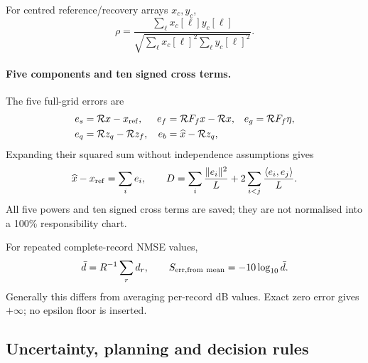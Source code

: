 For centred reference/recovery arrays $x_c,y_c$,
\begin{equation}
 \rho=\frac{\sum_\ell x_c[\ell]y_c[\ell]}
 {\sqrt{\sum_\ell x_c[\ell]^2\sum_\ell y_c[\ell]^2}}.
 \label{eq:r41-correlation}
\end{equation}

\paragraph{Five components and ten signed cross terms.}
The five full-grid errors are
\begin{align}
 e_s&=\mathcal R x-x_{\rm ref},&
 e_f&=\mathcal R F_fx-\mathcal R x,&
 e_g&=\mathcal R F_f\eta,\nonumber\\
 e_q&=\mathcal R z_q-\mathcal R z_f,&
 e_b&=\widehat x-\mathcal R z_q,
 \label{eq:r42-components}
\end{align}
Expanding their squared sum without independence assumptions gives
\begin{equation}
 \widehat x-x_{\rm ref}=\sum_i e_i,\qquad
 D=\sum_i\frac{\|e_i\|^2}{L}
   +2\sum_{i<j}\frac{\langle e_i,e_j\rangle}{L}.
 \label{eq:r42-component-power}
\end{equation}
All five powers and ten signed cross terms are saved; they are not
normalised into a 100\% responsibility chart.

For repeated complete-record NMSE values,
\begin{equation}
 \bar d=R^{-1}\sum_rd_r,\qquad
 S_{\rm err,from\ mean}=-10\log_{10}\bar d.
 \label{eq:r41-average}
\end{equation}
Generally this differs from averaging per-record dB values. Exact zero
error gives $+\infty$; no epsilon floor is inserted.

\subsection{Uncertainty, planning and decision rules}
\label{app:statistics}
